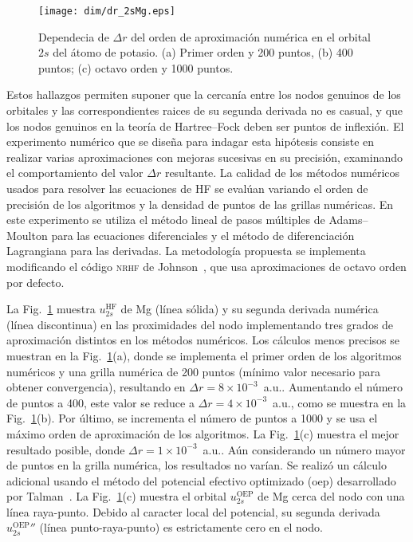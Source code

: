 {{{{\begin{figure}
\vspace{0.4cm}
\texttt{[image: dim/dr\_2sMg.eps]} 
\vspace{-0.45cm}
\caption[Dependecia de $\Delta r$ del orden de aproximación numérica.]
{Dependecia de $\Delta r$ del orden de aproximación numérica en el 
orbital $2s$ del átomo de potasio. (a) Primer orden y 200 puntos, (b) 
400 puntos; (c) octavo orden y 1000 puntos.}
\label{fig:dr2sMg}
\end{figure}

Estos hallazgos permiten suponer que la cercanía entre los nodos 
genuinos de los orbitales y las correspondientes raices de su segunda 
derivada no es casual, y que los nodos genuinos en la teoría de 
Hartree--Fock deben ser puntos de inflexión. El experimento numérico 
que se diseña para indagar esta hipótesis consiste en realizar varias 
aproximaciones con mejoras sucesivas en su precisión, examinando el 
comportamiento del valor $\Delta r$ resultante. La calidad de los 
métodos numéricos usados para resolver las ecuaciones de HF se evalúan 
variando el orden de precisión de los algoritmos y la densidad de puntos 
de las grillas numéricas. En este experimento se utiliza el método 
lineal de pasos múltiples de Adams--Moulton para las ecuaciones 
diferenciales y el método de diferenciación Lagrangiana para las 
derivadas. La metodología propuesta se implementa modificando el código 
\textsc{nrhf} de Johnson~\cite{Johnson:07}, que usa aproximaciones de 
octavo orden por defecto. %

La Fig.~\ref{fig:dr2sMg} muestra $u_{2s}^{\mathrm{HF}}$ de Mg (línea 
sólida) y su segunda derivada numérica (línea discontinua) en las 
proximidades del nodo implementando tres grados de aproximación 
distintos en los métodos numéricos. Los cálculos menos precisos se 
muestran en la Fig.~\ref{fig:dr2sMg}(a), donde se implementa el primer 
orden de los algoritmos numéricos y una grilla numérica de 200 puntos 
(mínimo valor necesario para obtener convergencia), resultando en 
$\Delta r=8\times 10^{-3}$~a.u.. Aumentando el número de puntos a 400, 
este valor se reduce a $\Delta r=4\times 10^{-3}$~a.u., como se muestra 
en la Fig.~\ref{fig:dr2sMg}(b). Por último, se incrementa el número de 
puntos a 1000 y se usa el máximo orden de aproximación de los 
algoritmos. La Fig.~\ref{fig:dr2sMg}(c) muestra el mejor resultado 
posible, donde $\Delta r=1\times 10^{-3}$~a.u.. Aún considerando un 
número mayor de puntos en la grilla numérica, los resultados no varían. 
Se realizó un cálculo adicional usando el método del potencial efectivo 
optimizado (\acs{oep}) desarrollado por Talman~\cite{Sharp:53,Talman:76,
Talman:89}. La Fig.~\ref{fig:dr2sMg}(c) muestra el orbital 
$u_{2s}^{\mathrm{OEP}}$ de Mg cerca del nodo con una línea raya-punto. 
Debido al caracter local del potencial, su segunda derivada 
$u_{2s}^{\mathrm{OEP}}''$ (línea punto-raya-punto) es estrictamente cero 
en el nodo. 

}}}}
